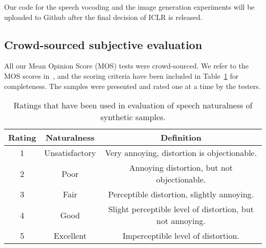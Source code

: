 Our code for the speech vocoding and the image generation experiments will be uploaded to Github after the final decision of ICLR is released.

\subsection{Crowd-sourced subjective evaluation}
All our Mean Opinion Score (MOS) tests were crowd-sourced. We refer to the MOS scores in~\citep{protasio_ribeiro_crowdmos_2011}, and the scoring criteria have been included in Table~\ref{matrix:naturalness} for completeness. The samples were presented and rated one at a time by the testers.

\begin{table}[t]
\centering
  \caption{Ratings that have been used in evaluation of speech naturalness of synthetic samples.}
  \label{matrix:naturalness}
  \begin{tabular}{ccc}
  \toprule
  Rating & Naturalness & Definition                           \\
  \midrule
  1      & Unsatisfactory        &  Very annoying, distortion is objectionable. \\
  2      & Poor       &  Annoying distortion, but not objectionable. \\
  3      & Fair       &  Perceptible distortion, slightly annoying.\\
  4      & Good       & Slight perceptible level of distortion, but not annoying.\\
  5      & Excellent  & Imperceptible level of distortion.\\
  \bottomrule
  \end{tabular}
  \end{table}

